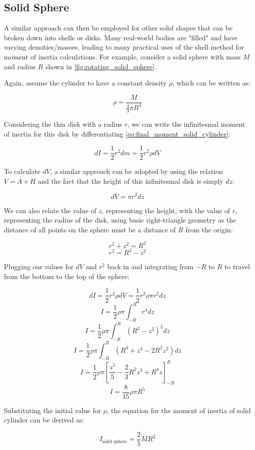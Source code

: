 \subsection{Solid Sphere}

A similar approach can then be employed for other solid shapes that can be broken down into shells or disks. Many real-world bodies are "filled" and have varying densities/masses, leading to many practical uses of the shell method for moment of inertia calculations. For example, consider a solid sphere with mass $M$ and radius $R$ shown in \cref{fig:rotating_solid_sphere}.



Again, assume the cylinder to have a constant density $\rho$, which can be written as:

\[\rho = \frac{M}{\frac{4}{3}\pi R^3}\]

Considering the thin disk with a radius $r$, we can write the infinitesmal moment of inertia for this disk by differentiating \cref{eq:final_moment_solid_cylinder}:

 \[dI = \frac{1}{2}r^2dm = \frac{1}{2}r^2\rho dV\]

 To calculate $dV$, a similar approach can be adopted by using the relation $V = A \times H$ and the fact that the height of this infinitesmal disk is simply $dz$:

 \[dV = \pi r^2 dz\]

 We can also relate the value of $z$, representing the height, with the value of $r$, representing the radius of the disk, using basic right-triangle geometry as the distance of all points on the sphere must be a distance of $R$ from the origin:

 \[r^2 + z^2 = R^2\]
 \[r^2 = R^2 - z^2\]

Plugging our values for $dV$ and $r^2$ back in and integrating from $-R$ to $R$ to travel from the bottom to the top of the sphere:

\[dI  = \frac{1}{2}r^2\rho dV = \frac{1}{2}r^2\rho \pi r^2 dz\]
\[I = \frac{1}{2}\rho \pi \int_{-R}^R r^4 dz\]
\[I = \frac{1}{2}\rho \pi \int_{-R}^R (R^2 - z^2)^2 dz\]
\[I =\frac{1}{2}\rho \pi \int_{-R}^R (R^4 + z^4 - 2R^2z^2) dz\]
\[I = \frac{1}{2}\rho \pi \left[\frac{z^5}{5} - \frac{2}{3}R^2z^3 + R^4z\right]_{-R}^{R}\]
\[I = \frac{8}{15}\rho \pi R^5\]

Substituting the initial value for $\rho$, the equation for the moment of inertia of solid cylinder can be derived as:

\begin{equation}
I_{\text{solid sphere}} = \frac{2}{5}MR^2
\label{eq:final_moment_solid_sphere}
\end{equation}